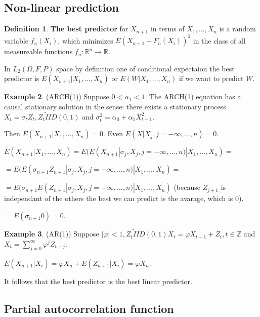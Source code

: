 \documentclass[12pt,a4paper]{amsart}
\theoremstyle{definition} %
\newtheorem{defn}{Definition}[section]
\newtheorem{example}[defn]{Example}
\theoremstyle{plain} %
\newcommand{\R}{\mathbb R}
\newcommand{\Z}{\mathbb Z}
\begin{document}
\subsection{Non-linear prediction}

\begin{defn}
{\bf The best predictor} for $X_{n+1}$ in terms of $X_1, \dots, X_n$ is a random variable $f_n(X_i)$, which minimizes 
$E(X_{n+1}- F_n(X_i))^2$ in the class of all measureable functions $f_n: \R^n \rightarrow \R$. 
\end{defn}

In $L_2(\Omega, F, P)$ space by definition one of conditional expectaion the best predictor is
$E(X_{n+1} | X_1, \dots, X_n)$ or $E(W | X_1, \dots, X_n)$ if we want to predict $W$. 

\begin{example} (ARCH(1))
Suppose $0< \alpha_1 < 1$. The ARCH(1) equation has a causal stationary solution in the sense:
there exists a stationary process $X_t = \sigma_t Z_t, Z_t \tilde IID(0,1)$ and $\sigma_t^2 = \alpha_0 + \alpha_1 X_{t-1}^2$. 

Then $E(X_{n+1} | X_1, \dots, X_n) = 0$. Even $E(X | X_j, j =-\infty, \dots, n) = 0$.

$E(X_{n+1} | X_1, \dots, X_n) = E(E(X_{n+1}|\sigma_j, X_j, j = -\infty, \dots, n)|X_1, \dots, X_n) = $

$=  E(E(\sigma_{n+1} Z_{n+1}|\sigma_j, X_j, j = -\infty, \dots, n)|X_1, \dots, X_n) = $

$=  E(\sigma_{n+1} E(Z_{n+1}|\sigma_j, X_j, j = -\infty, \dots, n)|X_1, \dots, X_n) $ (because $Z_{j+1}$ is independant of the others the best we can predict is the avarage, which is $0$).

$ = E(\sigma_{n+1} 0) = 0$.
\end{example}

\begin{example} (AR(1))
Suppose $|\varphi| < 1, Z_t \tilde IID(0,1) X_t = \varphi X_{t-1} + Z_t, t\in \Z$ and $X_t = \sum_{j = 0}^\infty \varphi^j Z_{t-j}$.

$E(X_{n+1}|X_i) = \varphi X_n + E(Z_{n+1} | X_i) = \varphi X_n$.

It follows that the best predictor is the best linear predictor.
\end{example}

\subsection{Partial autocorrelation function}
\end{document}

